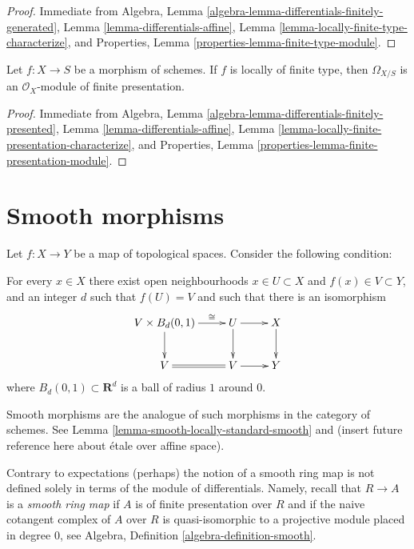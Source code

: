 \begin{proof}
Immediate from
Algebra, Lemma \ref{algebra-lemma-differentials-finitely-generated},
Lemma \ref{lemma-differentials-affine},
Lemma \ref{lemma-locally-finite-type-characterize}, and
Properties, Lemma \ref{properties-lemma-finite-type-module}.
\end{proof}

\begin{lemma}
\label{lemma-finite-presentation-differentials}
Let $f : X \to S$ be a morphism of schemes.
If $f$ is locally of finite type, then $\Omega_{X/S}$ is
an $\mathcal{O}_X$-module of finite presentation.
\end{lemma}

\begin{proof}
Immediate from
Algebra, Lemma \ref{algebra-lemma-differentials-finitely-presented},
Lemma \ref{lemma-differentials-affine},
Lemma \ref{lemma-locally-finite-presentation-characterize}, and
Properties, Lemma \ref{properties-lemma-finite-presentation-module}.
\end{proof}










\section{Smooth morphisms}
\label{section-smooth}

\noindent
Let $f : X \to Y$ be a map of topological spaces. Consider the following
condition:
\begin{list}{(*)}{}
\item For every $x \in X$ there exist open neighbourhoods
$x \in U \subset X$ and $f(x) \in V \subset Y$, and an integer $d$
such that $f(U) = V$ and such that there is an isomorphism
$$
\xymatrix{
V \times B_d(0, 1) \ar[r]^-{\cong} \ar[d] & U \ar[r] \ar[d] & X \ar[d] \\
V \ar@{=}[r] & V \ar[r] & Y
}
$$
where $B_d(0, 1) \subset \mathbf{R}^d$ is a ball of radius $1$ around $0$.
\end{list}
Smooth morphisms are the analogue of such morphisms in the category
of schemes. See Lemma \ref{lemma-smooth-locally-standard-smooth}
and (insert future reference here about
\'etale over affine space).

\medskip\noindent
Contrary to expectations (perhaps) the notion
of a smooth ring map is not defined solely in terms
of the module of differentials. Namely, recall that
$R \to A$ is a {\it smooth ring map} if $A$ is of finite presentation over $R$
and if the naive cotangent complex of $A$ over $R$ is quasi-isomorphic
to a projective module placed in degree $0$, see
Algebra, Definition \ref{algebra-definition-smooth}.

